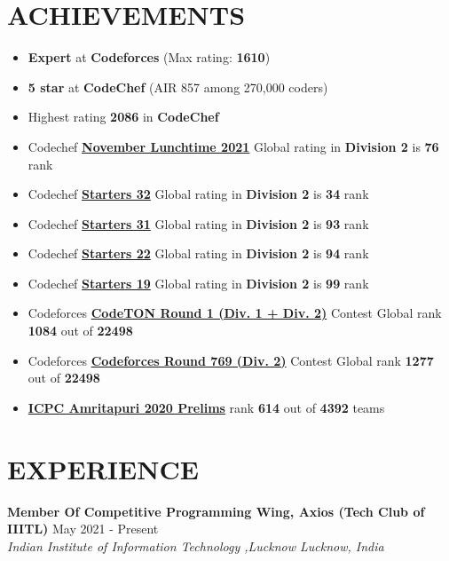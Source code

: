 \documentclass[12pt]{article}
\begin{document}
\section*{ACHIEVEMENTS}
\begin{itemize}[leftmargin=*, topsep=0pt,itemsep=2pt,partopsep=2pt, parsep=2pt]
\item \textbf{Expert} at \textbf{Codeforces} (Max rating: \textbf{1610})
\item \textbf{5 star} at \textbf{CodeChef} (AIR 857 among 270,000 coders)
\item Highest rating \textbf{2086} in \textbf{CodeChef}
\item Codechef \href{https://www.codechef.com/rankings/LTIME102B?order=asc&search=prabhav7&sortBy=rank}{\textbf{November Lunchtime 2021}}
             Global rating in \textbf{Division 2} is \textbf{76} rank
\item Codechef \href{https://www.codechef.com/rankings/START32B?order=asc&search=prabhav7&sortBy=rank}{\textbf{Starters 32}}
             Global rating in \textbf{Division 2} is \textbf{34} rank
\item Codechef \href{https://www.codechef.com/rankings/START31B?order=asc&search=prabhav7&sortBy=rank}{\textbf{Starters 31}}
             Global rating in \textbf{Division 2} is \textbf{93} rank
\item Codechef \href{https://www.codechef.com/rankings/START22B?order=asc&search=prabhav7&sortBy=rank}{\textbf{Starters 22}}
             Global rating in \textbf{Division 2} is \textbf{94} rank
\item Codechef \href{https://www.codechef.com/rankings/START19B?order=asc&search=prabhav7&sortBy=rank}{\textbf{Starters 19}}
             Global rating in \textbf{Division 2} is \textbf{99} rank
\item Codeforces \href{https://codeforces.com/contest/1656/standings/participant/130365506#p130365506}{\textbf{CodeTON Round 1 (Div. 1 + Div. 2)}} Contest Global rank \textbf{1084} out of \textbf{22498}
\item Codeforces \href{https://codeforces.com/contest/1632/standings/participant/127499880#p127499880}{\textbf{Codeforces Round 769 (Div. 2)}} Contest Global rank \textbf{1277} out of \textbf{22498}
\item \href{https://amrita.edu/wp-content/uploads/2021/11/icpc-ranklist.pdf}{\textbf{ICPC Amritapuri 2020 Prelims}} rank \textbf{614} out of \textbf{4392} teams
\end{itemize}

\section*{EXPERIENCE}
\textbf{Member Of Competitive Programming Wing, Axios (Tech Club of IIITL)} \hfill May 2021 - Present \\
\textit{Indian Institute of Information Technology ,Lucknow Lucknow, India}
\end{document}
